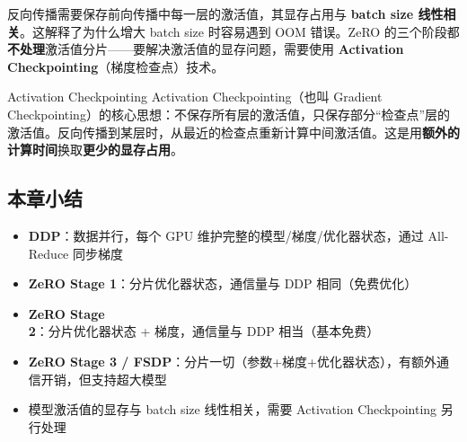 反向传播需要保存前向传播中每一层的激活值，其显存占用与 \textbf{batch size 线性相关}。这解释了为什么增大 batch size 时容易遇到 OOM 错误。ZeRO 的三个阶段都\textbf{不处理}激活值分片——要解决激活值的显存问题，需要使用 \textbf{Activation Checkpointing}（梯度检查点）技术。

\begin{knowledgebox}{Activation Checkpointing}
Activation Checkpointing（也叫 Gradient Checkpointing）的核心思想：不保存所有层的激活值，只保存部分``检查点''层的激活值。反向传播到某层时，从最近的检查点重新计算中间激活值。这是用\textbf{额外的计算时间}换取\textbf{更少的显存占用}。
\end{knowledgebox}

\subsection{本章小结}

\begin{itemize}
    \item \textbf{DDP}：数据并行，每个 GPU 维护完整的模型/梯度/优化器状态，通过 All-Reduce 同步梯度
    \item \textbf{ZeRO Stage 1}：分片优化器状态，通信量与 DDP 相同（免费优化）
    \item \textbf{ZeRO Stage 2}：分片优化器状态 + 梯度，通信量与 DDP 相当（基本免费）
    \item \textbf{ZeRO Stage 3 / FSDP}：分片一切（参数+梯度+优化器状态），有额外通信开销，但支持超大模型
    \item 模型激活值的显存与 batch size 线性相关，需要 Activation Checkpointing 另行处理
\end{itemize}


